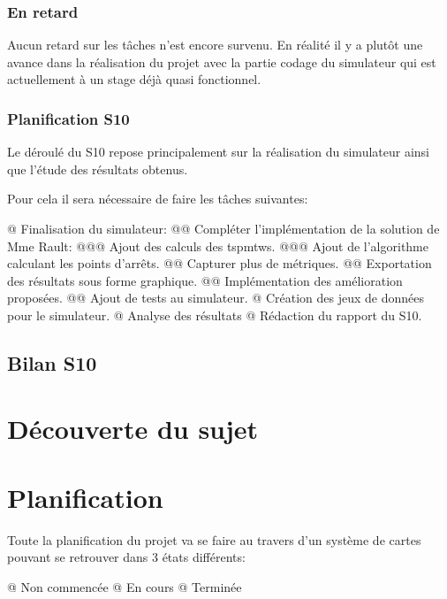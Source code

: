 \documentclass[final]{polytech/polytech}
\begin{document}
		\subsection{En retard}
			Aucun retard sur les tâches n'est encore survenu.
			En réalité il y a plutôt une avance dans la réalisation du projet avec la partie codage du simulateur qui est actuellement à un stage déjà quasi fonctionnel.
			
		\subsection{Planification S10}
			Le déroulé du S10 repose principalement sur la réalisation du simulateur ainsi que l'étude des résultats obtenus.
			
			Pour cela il sera nécessaire de faire les tâches suivantes:
			\begin{easylist}[itemize]
				@ Finalisation du simulateur:
				@@ Compléter l'implémentation de la solution de Mme Rault:
				@@@ Ajout des calculs des \glspl{tspmtw}.
				@@@ Ajout de l'algorithme calculant les points d'arrêts.
				@@ Capturer plus de métriques.
				@@ Exportation des résultats sous forme graphique.
				@@ Implémentation des amélioration proposées.
				@@ Ajout de tests au simulateur.
				@ Création des jeux de données pour le simulateur.
				@ Analyse des résultats
				@ Rédaction du rapport du S10.
			\end{easylist}

		
	\section{Bilan S10}
	
\appendix
\chapter{Découverte du sujet}
	
\chapter{Planification\label{sec:plannification}}
	Toute la planification du projet va se faire au travers d'un système de cartes pouvant se retrouver dans 3 états différents:
	\begin{easylist}
		@ Non commencée
		@ En cours
		@ Terminée	
	\end{easylist}
	
\end{document}
